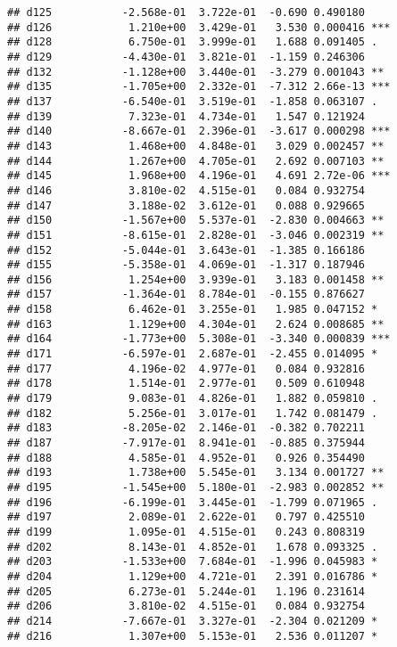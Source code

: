 \documentclass[
]{article}
\begin{document}
\begin{verbatim}
## d125           -2.568e-01  3.722e-01  -0.690 0.490180    
## d126            1.210e+00  3.429e-01   3.530 0.000416 ***
## d128            6.750e-01  3.999e-01   1.688 0.091405 .  
## d129           -4.430e-01  3.821e-01  -1.159 0.246306    
## d132           -1.128e+00  3.440e-01  -3.279 0.001043 ** 
## d135           -1.705e+00  2.332e-01  -7.312 2.66e-13 ***
## d137           -6.540e-01  3.519e-01  -1.858 0.063107 .  
## d139            7.323e-01  4.734e-01   1.547 0.121924    
## d140           -8.667e-01  2.396e-01  -3.617 0.000298 ***
## d143            1.468e+00  4.848e-01   3.029 0.002457 ** 
## d144            1.267e+00  4.705e-01   2.692 0.007103 ** 
## d145            1.968e+00  4.196e-01   4.691 2.72e-06 ***
## d146            3.810e-02  4.515e-01   0.084 0.932754    
## d147            3.188e-02  3.612e-01   0.088 0.929665    
## d150           -1.567e+00  5.537e-01  -2.830 0.004663 ** 
## d151           -8.615e-01  2.828e-01  -3.046 0.002319 ** 
## d152           -5.044e-01  3.643e-01  -1.385 0.166186    
## d155           -5.358e-01  4.069e-01  -1.317 0.187946    
## d156            1.254e+00  3.939e-01   3.183 0.001458 ** 
## d157           -1.364e-01  8.784e-01  -0.155 0.876627    
## d158            6.462e-01  3.255e-01   1.985 0.047152 *  
## d163            1.129e+00  4.304e-01   2.624 0.008685 ** 
## d164           -1.773e+00  5.308e-01  -3.340 0.000839 ***
## d171           -6.597e-01  2.687e-01  -2.455 0.014095 *  
## d177            4.196e-02  4.977e-01   0.084 0.932816    
## d178            1.514e-01  2.977e-01   0.509 0.610948    
## d179            9.083e-01  4.826e-01   1.882 0.059810 .  
## d182            5.256e-01  3.017e-01   1.742 0.081479 .  
## d183           -8.205e-02  2.146e-01  -0.382 0.702211    
## d187           -7.917e-01  8.941e-01  -0.885 0.375944    
## d188            4.585e-01  4.952e-01   0.926 0.354490    
## d193            1.738e+00  5.545e-01   3.134 0.001727 ** 
## d195           -1.545e+00  5.180e-01  -2.983 0.002852 ** 
## d196           -6.199e-01  3.445e-01  -1.799 0.071965 .  
## d197            2.089e-01  2.622e-01   0.797 0.425510    
## d199            1.095e-01  4.515e-01   0.243 0.808319    
## d202            8.143e-01  4.852e-01   1.678 0.093325 .  
## d203           -1.533e+00  7.684e-01  -1.996 0.045983 *  
## d204            1.129e+00  4.721e-01   2.391 0.016786 *  
## d205            6.273e-01  5.244e-01   1.196 0.231614    
## d206            3.810e-02  4.515e-01   0.084 0.932754    
## d214           -7.667e-01  3.327e-01  -2.304 0.021209 *  
## d216            1.307e+00  5.153e-01   2.536 0.011207 *  

\end{verbatim}
\end{document}
